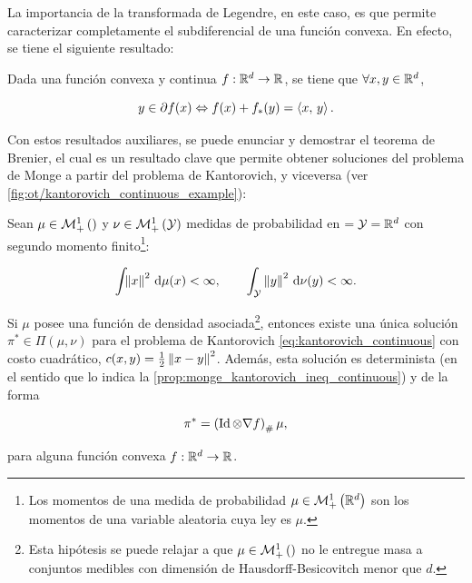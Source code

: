 La importancia de la transformada de Legendre, en este caso, es que permite caracterizar completamente el subdiferencial de una función convexa. En efecto, se tiene el siguiente resultado:

\begin{prop}
	\label{prop:subdiff_legendre}
	Dada una función convexa y continua $f:\mathbb{R}^d\to\mathbb{R}$, se tiene que $\forall x,y\in\mathbb{R}^d$,

	\begin{equation*}
		y\in\partial f(x) \Leftrightarrow f(x) + f_*(y) = \left\langle x,\,y\right\rangle.
	\end{equation*}
\end{prop}

Con estos resultados auxiliares, se puede enunciar y demostrar el teorema de Brenier, el cual es un resultado clave que permite obtener soluciones del problema de Monge a partir del problema de Kantorovich, y viceversa (ver \autoref{fig:ot/kantorovich_continuous_example}):

\begin{teo}[Brenier]
	\label{teo:brenier}
	Sean $\mu\in\mathcal{M}_+^1\left(\right)$ y $\nu\in\mathcal{M}_+^1\left(\mathcal{Y}\right)$ medidas de probabilidad en $=\mathcal{Y}=\mathbb{R}^d$ con segundo momento finito\footnote{Los momentos de una medida de probabilidad $\mu\in\mathcal{M}_+^1\left(\mathbb{R}^d\right)$ son los momentos de una variable aleatoria cuya ley es $\mu$.}:

	\begin{equation*}
		\int_{} \left\lVert x \right\rVert^2 \,\operatorname{d}\!\mu(x)<\infty,
		\qquad
		\int_{\mathcal{Y}} \left\lVert y \right\rVert^2 \,\operatorname{d}\!\nu(y)<\infty .
	\end{equation*}

	Si $\mu$ posee una función de densidad asociada\footnote{Esta hipótesis se puede relajar a que $\mu\in\mathcal{M}_+^1\left(\right)$ no le entregue masa a conjuntos medibles con dimensión de Hausdorff-Besicovitch menor que $d$.}, entonces existe una única solución $\pi^*\in\Pi(\mu,\nu)$ para el problema de Kantorovich \eqref{eq:kantorovich_continuous} con costo cuadrático, $c(x,y)=\frac{1}{2}\left\lVert x-y \right\rVert^2$. Además, esta solución es determinista (en el sentido que lo indica la \autoref{prop:monge_kantorovich_ineq_continuous}) y de la forma

	\begin{equation*}
		\pi^* = \left(\operatorname{Id}\otimes \nabla f\right)_\#\mu ,
	\end{equation*}

	para alguna función convexa $f:\mathbb{R}^d\to\mathbb{R}$.
\end{teo}

